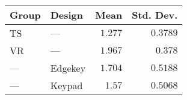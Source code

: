 \begin{tabular}{llrr}
\toprule
Group &   Design &    Mean &  Std. Dev. \\
\midrule
   TS &      --- & $1.277$ &   $0.3789$ \\
   VR &      --- & $1.967$ &    $0.378$ \\
  --- &  Edgekey & $1.704$ &   $0.5188$ \\
  --- &   Keypad &  $1.57$ &   $0.5068$ \\
\bottomrule
\end{tabular}
